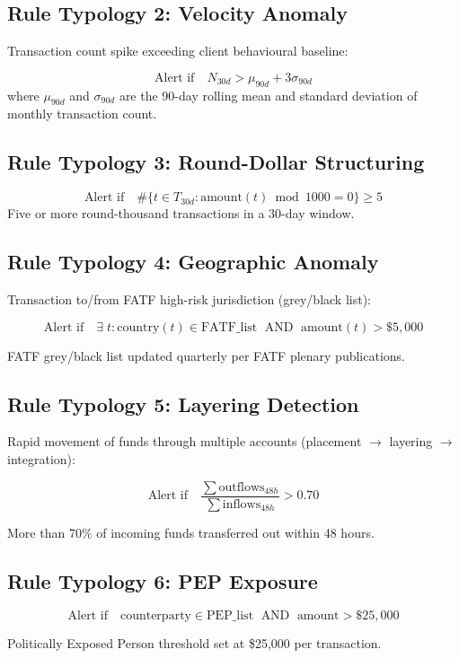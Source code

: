 \documentclass{apex_mdd}
\begin{document}
\subsection{Rule Typology 2: Velocity Anomaly}
Transaction count spike exceeding client behavioural baseline:
\begin{formulabox}
\[
  \text{Alert if}\quad N_{30d} > \mu_{90d} + 3\sigma_{90d}
\]
where $\mu_{90d}$ and $\sigma_{90d}$ are the 90-day rolling mean and standard deviation of monthly transaction count.
\end{formulabox}

\subsection{Rule Typology 3: Round-Dollar Structuring}
\begin{formulabox}
\[
  \text{Alert if}\quad \#\bigl\{t \in T_{30d} : \text{amount}(t) \bmod 1000 = 0\bigr\} \geq 5
\]
Five or more round-thousand transactions in a 30-day window.
\end{formulabox}

\subsection{Rule Typology 4: Geographic Anomaly}
Transaction to/from FATF high-risk jurisdiction (grey/black list):
\begin{formulabox}
\[
  \text{Alert if}\quad \exists\; t : \text{country}(t) \in \text{FATF\_list} \;\text{ AND }\; \text{amount}(t) > \$5{,}000
\]
\end{formulabox}
FATF grey/black list updated quarterly per FATF plenary publications.

\subsection{Rule Typology 5: Layering Detection}
Rapid movement of funds through multiple accounts (placement $\to$ layering $\to$ integration):
\begin{formulabox}
\[
  \text{Alert if}\quad \frac{\sum \text{outflows}_{48h}}{\sum \text{inflows}_{48h}} > 0.70
\]
\end{formulabox}
More than 70\% of incoming funds transferred out within 48 hours.

\subsection{Rule Typology 6: PEP Exposure}
\begin{formulabox}
\[
  \text{Alert if}\quad \text{counterparty} \in \text{PEP\_list} \;\text{ AND }\; \text{amount} > \$25{,}000
\]
\end{formulabox}
Politically Exposed Person threshold set at \$25,000 per transaction.
\end{document}
